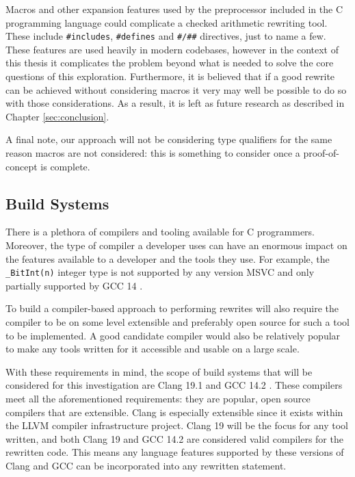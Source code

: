 Macros and other expansion features \cite{macros} used by the preprocessor included in the C programming language could complicate a checked arithmetic rewriting tool. These include \texttt{\#includes}, \texttt{\#defines} and \texttt{\#/\#\#} directives, just to name a few. These features are used heavily in modern codebases, however in the context of this thesis it complicates the problem beyond what is needed to solve the core questions of this exploration. Furthermore, it is believed that if a good rewrite can be achieved without considering macros it very may well be possible to do so with those considerations. As a result, it is left as future research as described in Chapter \ref{sec:conclusion}.

A final note, our approach will not be considering type qualifiers for the same reason macros are not considered: this is something to consider once a proof-of-concept is complete.

\subsection{Build Systems}

There is a plethora of compilers and tooling available for C programmers. Moreover, the type of compiler a developer uses can have an enormous impact on the features available to a developer and the tools they use. For example, the \texttt{\_BitInt(n)} integer type is not supported by any version MSVC and only partially supported by GCC 14 \cite{compiler_support}.

To build a compiler-based approach to performing rewrites will also require the compiler to be on some level extensible and preferably open source for such a tool to be implemented. A good candidate compiler would also be relatively popular to make any tools written for it accessible and usable on a large scale.

With these requirements in mind, the scope of build systems that will be considered for this investigation are Clang 19.1 \cite{clang19} and GCC 14.2 \cite{gcc14}. These compilers meet all the aforementioned requirements: they are popular, open source compilers that are extensible. Clang is especially extensible since it exists within the LLVM compiler infrastructure project. Clang 19 will be the focus for any tool written, and both Clang 19 and GCC 14.2 are considered valid compilers for the rewritten code. This means any language features supported by these versions of Clang and GCC can be incorporated into any rewritten statement.

